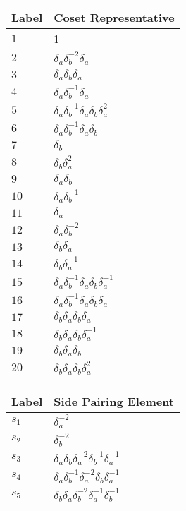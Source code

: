 \documentclass{article}
\begin{document}
\begin{center}
\begin{tabular}{ll}
\toprule
Label & Coset Representative\\
\midrule
$1$ & 1 \\
$2$ & $\delta_a^{}\delta_b^{-2}\delta_a^{}$ \\
$3$ & $\delta_a^{}\delta_b^{}\delta_a^{}$ \\
$4$ & $\delta_a^{}\delta_b^{-1}\delta_a^{}$ \\
$5$ & $\delta_a^{}\delta_b^{-1}\delta_a^{}\delta_b^{}\delta_a^{2}$ \\
$6$ & $\delta_a^{}\delta_b^{-1}\delta_a^{}\delta_b^{}$ \\
$7$ & $\delta_b^{}$ \\
$8$ & $\delta_b^{}\delta_a^{2}$ \\
$9$ & $\delta_a^{}\delta_b^{}$ \\
$10$ & $\delta_a^{}\delta_b^{-1}$ \\
$11$ & $\delta_a^{}$ \\
$12$ & $\delta_a^{}\delta_b^{-2}$ \\
$13$ & $\delta_b^{}\delta_a^{}$ \\
$14$ & $\delta_b^{}\delta_a^{-1}$ \\
$15$ & $\delta_a^{}\delta_b^{-1}\delta_a^{}\delta_b^{}\delta_a^{-1}$ \\
$16$ & $\delta_a^{}\delta_b^{-1}\delta_a^{}\delta_b^{}\delta_a^{}$ \\
$17$ & $\delta_b^{}\delta_a^{}\delta_b^{}\delta_a^{}$ \\
$18$ & $\delta_b^{}\delta_a^{}\delta_b^{}\delta_a^{-1}$ \\
$19$ & $\delta_b^{}\delta_a^{}\delta_b^{}$ \\
$20$ & $\delta_b^{}\delta_a^{}\delta_b^{}\delta_a^{2}$ \\
\bottomrule
\end{tabular}
\hfill
\begin{tabular}{ll}
\toprule
Label & Side Pairing Element\\
\midrule
$s_{1}$ & $\delta_a^{-2}$ \\
$s_{2}$ & $\delta_b^{-2}$ \\
$s_{3}$ & $\delta_a^{}\delta_b^{}\delta_a^{-2}\delta_b^{-1}\delta_a^{-1}$ \\
$s_{4}$ & $\delta_a^{}\delta_b^{-1}\delta_a^{-2}\delta_b^{}\delta_a^{-1}$ \\
$s_{5}$ & $\delta_b^{}\delta_a^{}\delta_b^{-2}\delta_a^{-1}\delta_b^{-1}$ \\

\end{tabular}
\end{center}
\end{document}
